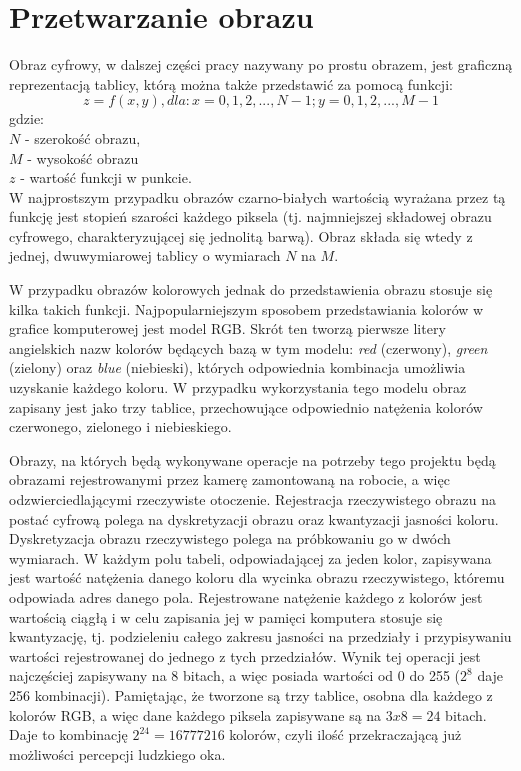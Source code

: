 \section{Przetwarzanie obrazu}
Obraz cyfrowy, w dalszej części pracy nazywany po prostu obrazem, jest graficzną reprezentacją tablicy, którą można także przedstawić za pomocą funkcji:
\begin{equation}
\label{funkcja_obrazu}
    z = f(x,y), dla: x = 0, 1, 2, ..., N-1; y = 0, 1, 2, ..., M-1
\end{equation}
gdzie:\\
$N$ - szerokość obrazu,\\
$M$ - wysokość obrazu\\
$z$ - wartość funkcji w punkcie.\\
W najprostszym przypadku obrazów czarno-białych wartością wyrażana przez tą funkcję jest stopień szarości każdego piksela (tj. najmniejszej składowej obrazu cyfrowego, charakteryzującej się jednolitą barwą). Obraz składa się wtedy z jednej, dwuwymiarowej tablicy o wymiarach $N$ na $M$.

W przypadku obrazów kolorowych jednak do przedstawienia obrazu stosuje się kilka takich funkcji. Najpopularniejszym sposobem przedstawiania kolorów w grafice komputerowej jest model RGB. Skrót ten tworzą pierwsze litery angielskich nazw kolorów będących bazą w tym modelu: \textit{red} (czerwony), \textit{green} (zielony) oraz \textit{blue} (niebieski), których odpowiednia kombinacja umożliwia uzyskanie każdego koloru. W przypadku wykorzystania tego modelu obraz zapisany jest jako trzy tablice, przechowujące odpowiednio natężenia kolorów czerwonego, zielonego i niebieskiego.

Obrazy, na których będą wykonywane operacje na potrzeby tego projektu będą obrazami rejestrowanymi przez kamerę zamontowaną na robocie, a więc odzwierciedlającymi rzeczywiste otoczenie. Rejestracja rzeczywistego obrazu na postać cyfrową polega na dyskretyzacji obrazu oraz kwantyzacji jasności koloru\cite{Malina}. Dyskretyzacja obrazu rzeczywistego polega na próbkowaniu go w dwóch wymiarach. W każdym polu tabeli, odpowiadającej za jeden kolor, zapisywana jest wartość natężenia danego koloru dla wycinka obrazu rzeczywistego, któremu odpowiada adres danego pola. Rejestrowane natężenie każdego z kolorów jest wartością ciągłą i w celu zapisania jej w pamięci komputera stosuje się kwantyzację, tj. podzieleniu całego zakresu jasności na przedziały i przypisywaniu wartości rejestrowanej do jednego z tych przedziałów. Wynik tej operacji jest najczęściej zapisywany na 8 bitach, a więc posiada wartości od 0 do 255 ($2^8$ daje 256 kombinacji). Pamiętając, że tworzone są trzy tablice, osobna dla każdego z kolorów RGB, a więc dane każdego piksela zapisywane są na $3 x 8 = 24$ bitach. Daje to kombinację $2^{24} = 16777216$ kolorów, czyli ilość przekraczającą już możliwości percepcji ludzkiego oka.


